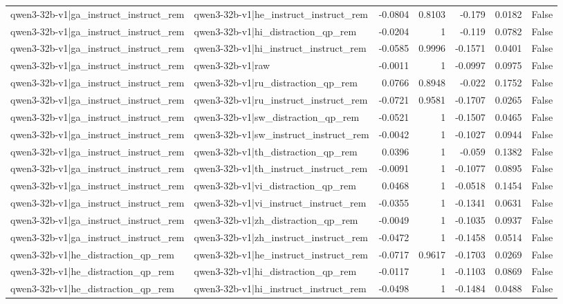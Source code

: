 \begin{table}
\begin{tabular}{l l r r r r l}
qwen3-32b-v1|ga_instruct_instruct_rem & qwen3-32b-v1|he_instruct_instruct_rem & -0.0804 & 0.8103 & -0.179 & 0.0182 & False \\
qwen3-32b-v1|ga_instruct_instruct_rem & qwen3-32b-v1|hi_distraction_qp_rem & -0.0204 & 1 & -0.119 & 0.0782 & False \\
qwen3-32b-v1|ga_instruct_instruct_rem & qwen3-32b-v1|hi_instruct_instruct_rem & -0.0585 & 0.9996 & -0.1571 & 0.0401 & False \\
qwen3-32b-v1|ga_instruct_instruct_rem & qwen3-32b-v1|raw & -0.0011 & 1 & -0.0997 & 0.0975 & False \\
qwen3-32b-v1|ga_instruct_instruct_rem & qwen3-32b-v1|ru_distraction_qp_rem & 0.0766 & 0.8948 & -0.022 & 0.1752 & False \\
qwen3-32b-v1|ga_instruct_instruct_rem & qwen3-32b-v1|ru_instruct_instruct_rem & -0.0721 & 0.9581 & -0.1707 & 0.0265 & False \\
qwen3-32b-v1|ga_instruct_instruct_rem & qwen3-32b-v1|sw_distraction_qp_rem & -0.0521 & 1 & -0.1507 & 0.0465 & False \\
qwen3-32b-v1|ga_instruct_instruct_rem & qwen3-32b-v1|sw_instruct_instruct_rem & -0.0042 & 1 & -0.1027 & 0.0944 & False \\
qwen3-32b-v1|ga_instruct_instruct_rem & qwen3-32b-v1|th_distraction_qp_rem & 0.0396 & 1 & -0.059 & 0.1382 & False \\
qwen3-32b-v1|ga_instruct_instruct_rem & qwen3-32b-v1|th_instruct_instruct_rem & -0.0091 & 1 & -0.1077 & 0.0895 & False \\
qwen3-32b-v1|ga_instruct_instruct_rem & qwen3-32b-v1|vi_distraction_qp_rem & 0.0468 & 1 & -0.0518 & 0.1454 & False \\
qwen3-32b-v1|ga_instruct_instruct_rem & qwen3-32b-v1|vi_instruct_instruct_rem & -0.0355 & 1 & -0.1341 & 0.0631 & False \\
qwen3-32b-v1|ga_instruct_instruct_rem & qwen3-32b-v1|zh_distraction_qp_rem & -0.0049 & 1 & -0.1035 & 0.0937 & False \\
qwen3-32b-v1|ga_instruct_instruct_rem & qwen3-32b-v1|zh_instruct_instruct_rem & -0.0472 & 1 & -0.1458 & 0.0514 & False \\
qwen3-32b-v1|he_distraction_qp_rem & qwen3-32b-v1|he_instruct_instruct_rem & -0.0717 & 0.9617 & -0.1703 & 0.0269 & False \\
qwen3-32b-v1|he_distraction_qp_rem & qwen3-32b-v1|hi_distraction_qp_rem & -0.0117 & 1 & -0.1103 & 0.0869 & False \\
qwen3-32b-v1|he_distraction_qp_rem & qwen3-32b-v1|hi_instruct_instruct_rem & -0.0498 & 1 & -0.1484 & 0.0488 & False \\

\end{tabular}
\end{table}
